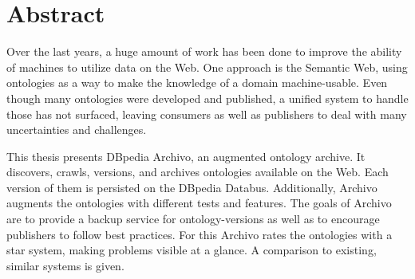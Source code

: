 \section*{Abstract}
Over the last years, a huge amount of work has been done to improve the ability of machines to utilize data on the Web. One approach is the Semantic Web, using ontologies as a way to make the knowledge of a domain machine-usable. Even though many ontologies were developed and published, a unified system to handle those has not surfaced, leaving consumers as well as publishers to deal with many uncertainties and challenges. 

This thesis presents DBpedia Archivo, an augmented ontology archive. It discovers, crawls, versions, and archives ontologies available on the Web. Each version of them is persisted on the DBpedia Databus. Additionally, Archivo augments the ontologies with different tests and features. 
The goals of Archivo are to provide a backup service for ontology-versions as well as to encourage publishers to follow best practices. 
For this Archivo rates the ontologies with a star system, making problems visible at a glance. A comparison to existing, similar systems is given.

\cleardoublepage




